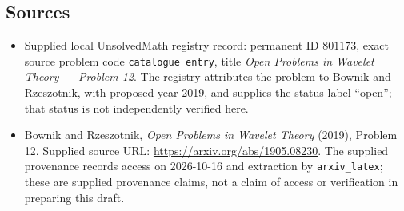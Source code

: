 \documentclass[11pt]{article}
\begin{document}
\subsection{Sources}
\begin{itemize}
\item Supplied local UnsolvedMath registry record: permanent ID \(801173\), exact source problem code \texttt{catalogue entry}, title \emph{Open Problems in Wavelet Theory --- Problem 12}. The registry attributes the problem to Bownik and Rzeszotnik, with proposed year 2019, and supplies the status label ``open''; that status is not independently verified here.
\item Bownik and Rzeszotnik, \emph{Open Problems in Wavelet Theory} (2019), Problem 12. Supplied source URL: \url{https://arxiv.org/abs/1905.08230}. The supplied provenance records access on 2026-10-16 and extraction by \texttt{arxiv\_latex}; these are supplied provenance claims, not a claim of access or verification in preparing this draft.
\end{itemize}
\end{document}
